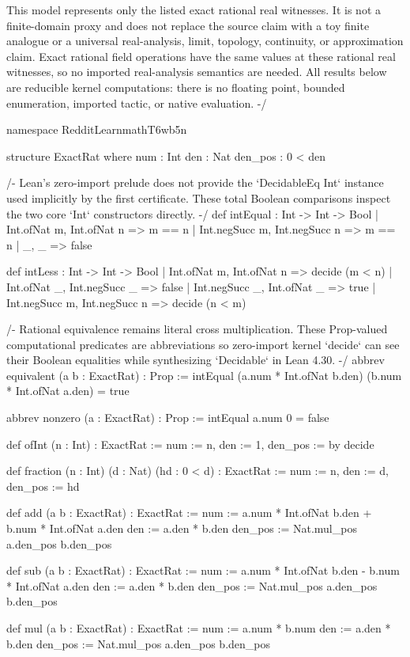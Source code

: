 \documentclass[11pt]{article}
\begin{document}
\begin{Vlean}
This model represents only the listed exact rational real witnesses. It is
not a finite-domain proxy and does not replace the source claim with a toy
finite analogue or a universal real-analysis, limit, topology, continuity, or
approximation claim. Exact rational field operations have the same values at
these rational real witnesses, so no imported real-analysis semantics are
needed. All results below are reducible kernel computations: there is no
floating point, bounded enumeration, imported tactic, or native evaluation.
-/

namespace RedditLearnmathT6wb5n

structure ExactRat where
  num : Int
  den : Nat
  den_pos : 0 < den

/- Lean's zero-import prelude does not provide the `DecidableEq Int` instance
used implicitly by the first certificate. These total Boolean comparisons
inspect the two core `Int` constructors directly. -/
def intEqual : Int -> Int -> Bool
  | Int.ofNat m, Int.ofNat n => m == n
  | Int.negSucc m, Int.negSucc n => m == n
  | _, _ => false

def intLess : Int -> Int -> Bool
  | Int.ofNat m, Int.ofNat n => decide (m < n)
  | Int.ofNat _, Int.negSucc _ => false
  | Int.negSucc _, Int.ofNat _ => true
  | Int.negSucc m, Int.negSucc n => decide (n < m)

/- Rational equivalence remains literal cross multiplication. These
Prop-valued computational predicates are abbreviations so zero-import kernel
`decide` can see their Boolean equalities while synthesizing `Decidable` in
Lean 4.30. -/
abbrev equivalent (a b : ExactRat) : Prop :=
  intEqual (a.num * Int.ofNat b.den) (b.num * Int.ofNat a.den) = true

abbrev nonzero (a : ExactRat) : Prop :=
  intEqual a.num 0 = false

def ofInt (n : Int) : ExactRat :=
  { num := n, den := 1, den_pos := by decide }

def fraction (n : Int) (d : Nat) (hd : 0 < d) : ExactRat :=
  { num := n, den := d, den_pos := hd }

def add (a b : ExactRat) : ExactRat :=
  { num := a.num * Int.ofNat b.den + b.num * Int.ofNat a.den
    den := a.den * b.den
    den_pos := Nat.mul_pos a.den_pos b.den_pos }

def sub (a b : ExactRat) : ExactRat :=
  { num := a.num * Int.ofNat b.den - b.num * Int.ofNat a.den
    den := a.den * b.den
    den_pos := Nat.mul_pos a.den_pos b.den_pos }

def mul (a b : ExactRat) : ExactRat :=
  { num := a.num * b.num
    den := a.den * b.den
    den_pos := Nat.mul_pos a.den_pos b.den_pos }


\end{Vlean}
\end{document}
